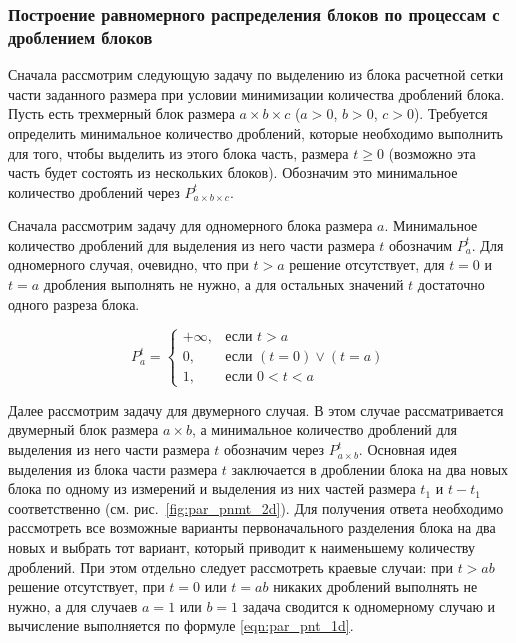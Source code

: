 \subsubsection{Построение равномерного распределения блоков по \mbox{процессам} с дроблением блоков}

Сначала рассмотрим следующую задачу по выделению из блока расчетной сетки части заданного размера при условии минимизации количества дроблений блока.
Пусть есть трехмерный блок размера $a \times b \times c$ ($a > 0$, $b > 0$, $c > 0$).
Требуется определить минимальное количество дроблений, которые необходимо выполнить для того, чтобы выделить из этого блока часть, размера $t \ge 0$ (возможно эта часть будет состоять из нескольких блоков).
Обозначим это минимальное количество дроблений через $P_{a \times b \times c}^t$.

Сначала рассмотрим задачу для одномерного блока размера $a$.
Минимальное количество дроблений для выделения из него части размера $t$ обозначим $P_a^t$.
Для одномерного случая, очевидно, что при $t > a$ решение отсутствует, для $t = 0$ и $t = a$ дробления выполнять не нужно, а для остальных значений $t$ достаточно одного разреза блока.

\begin{equation}\label{eqn:par_pnt_1d}
P_a^t =
	\begin{cases}
		+\infty, & \text{если } t > a \\[-8pt]
		0, & \text{если } (t = 0) \vee (t = a) \\[-8pt]
		1, & \text{если } 0 < t < a
	\end{cases}
\end{equation}

Далее рассмотрим задачу для двумерного случая.
В этом случае рассматривается двумерный блок размера $a \times b$, а минимальное количество дроблений для выделения из него части размера $t$ обозначим через $P_{a \times b}^t$.
Основная идея выделения из блока части размера $t$ заключается в дроблении блока на два новых блока по одному из измерений и выделения из них частей размера $t_1$ и $t - t_1$ соответственно (см. рис.~\ref{fig:par_pnmt_2d}).
Для получения ответа необходимо рассмотреть все возможные варианты первоначального разделения блока на два новых и выбрать тот вариант, который приводит к наименьшему количеству дроблений.
При этом отдельно следует рассмотреть краевые случаи: при $t > ab$ решение отсутствует, при $t = 0$ или $t = ab$ никаких дроблений выполнять не нужно, а для случаев $a = 1$ или $b = 1$ задача сводится к одномерному случаю и вычисление выполняется по формуле \eqref{eqn:par_pnt_1d}.

